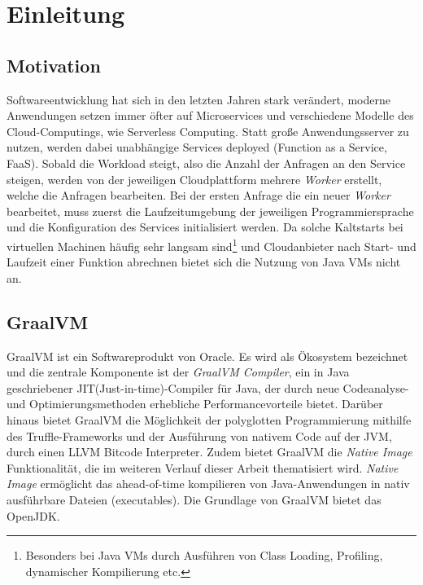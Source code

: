 \section{Einleitung}
\label{sec:einleitung}

\subsection{Motivation}
\label{subsec:motivation}
Softwareentwicklung hat sich in den letzten Jahren stark verändert, moderne Anwendungen setzen immer öfter auf Microservices und verschiedene Modelle des Cloud-Computings, wie
Serverless Computing. Statt große Anwendungsserver zu nutzen, werden dabei unabhängige Services deployed (Function as a Service, FaaS). Sobald die Workload steigt, also die Anzahl der Anfragen an den Service steigen,
werden von der jeweiligen Cloudplattform mehrere \textit{Worker} erstellt, welche die Anfragen bearbeiten. Bei der ersten Anfrage die ein neuer \textit{Worker} bearbeitet, muss zuerst die Laufzeitumgebung 
der jeweiligen Programmiersprache und die Konfiguration des Services initialisiert werden. Da solche Kaltstarts bei virtuellen Machinen häufig sehr langsam sind\footnote{Besonders bei Java VMs
 durch Ausführen von Class Loading, Profiling, dynamischer Kompilierung etc.} und Cloudanbieter nach Start- und Laufzeit einer Funktion abrechnen bietet sich die Nutzung von Java VMs nicht an.

\subsection{GraalVM}
\label{subsec:graalvm}

GraalVM ist ein Softwareprodukt von Oracle. Es wird als Ökosystem bezeichnet und die zentrale Komponente ist der \textit{GraalVM Compiler}, ein in Java geschriebener JIT(Just-in-time)-Compiler für Java, der durch neue Codeanalyse- und 
 Optimierungsmethoden erhebliche Performancevorteile bietet.
Darüber hinaus bietet GraalVM die Möglichkeit der polyglotten Programmierung mithilfe des Truffle-Frameworks und der Ausführung von nativem Code auf der JVM, durch einen LLVM Bitcode Interpreter.
Zudem bietet GraalVM die \textit{Native Image} Funktionalität, die im weiteren Verlauf dieser Arbeit thematisiert wird. \textit{Native Image} ermöglicht das ahead-of-time kompilieren von Java-Anwendungen in nativ ausführbare Dateien (executables).
Die Grundlage von GraalVM bietet das OpenJDK\parencite{GraalComponents}.\newline

